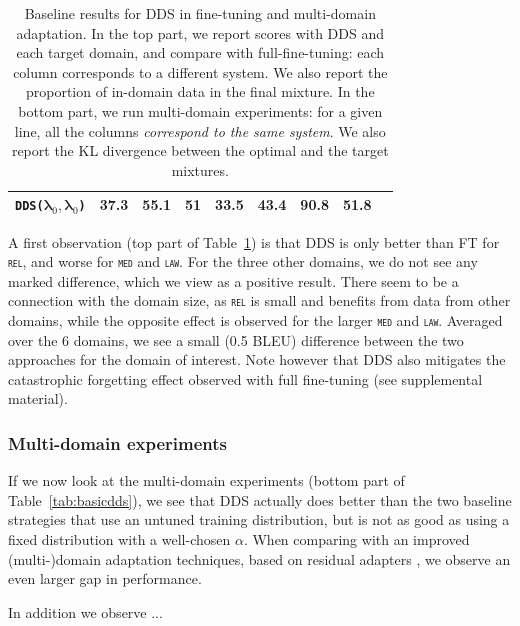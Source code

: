 \documentclass[11pt,a4paper]{article}
\newcommand{\fyTodo}[1]{\Todo[FY:]{\textcolor{orange}{#1}}}
\newcommand{\domain}[1]{\texttt{\textsc{#1}}}
\newcommand{\system}[1]{\texttt{{#1}}}
\newcommand{\vlambda}{\ensuremath{\boldsymbol\lambda}\xspace} %
\begin{document}
\begin{table}
\begin{tabular}{|l|*8{r|}}
    \system{DDS($\vlambda_0, \vlambda_0$)} &37.3&55.1&51&33.5&43.4&90.8&51.8\\ \hline
  \end{tabular}
  \caption{Baseline results for DDS in fine-tuning and multi-domain adaptation. In the top part, we report scores with DDS and each target domain, and compare with full-fine-tuning: each column corresponds to a different system. We also report the proportion of in-domain data in the final mixture. In the bottom part, we run multi-domain experiments: for a given line, all the columns \emph{correspond to the same system}. We also report the KL divergence between the optimal and the target mixtures.}
  \label{tab:basic-dds}
\end{table}

A first observation (top part of Table~\ref{tab:basic-dds}) is that DDS is only better than FT for \domain{rel}, and worse for \domain{med} and \domain{law}. For the three other domains, we do not see any marked difference, which we view as a positive result. There seem to be a connection with the domain size, as \domain{rel} is small and benefits from data from other domains, while the opposite effect is observed for the larger \domain{med} and \domain{law}. Averaged over the 6 domains, we see a small (0.5 BLEU) difference between the two approaches for the domain of interest. Note however that DDS also mitigates the catastrophic forgetting effect observed with full fine-tuning (see supplemental material).\fyTodo{Supplementary}

\subsubsection{Multi-domain experiments}

If we now look at the multi-domain experiments (bottom part of Table~\ref{tab:basicdds}), we see that DDS actually does better than the two baseline strategies that use an untuned training distribution, but is not as good as using a fixed distribution with a well-chosen $\alpha$. When comparing with an improved (multi-)domain adaptation techniques, based on residual adapters \cite{Bapna19simple,Pham20astudy}, we observe an even larger gap in performance.

In addition we observe ...\fyTodo{To be continued}
\end{document}
